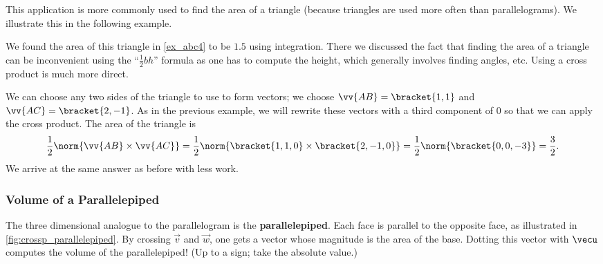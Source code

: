 This application is more commonly used to find the area of a triangle (because triangles are used more often than parallelograms). We illustrate this in the following example.

{We found the area of this triangle in \autoref{ex_abc4} to be $1.5$ using integration. There we discussed the fact that finding the area of a triangle can be inconvenient using the ``$\frac12bh$'' formula as one has to compute the height, which generally involves finding angles, etc. Using a cross product is much more direct.


We can choose any two sides of the triangle to use to form vectors; we choose $\vv{AB} = \bracket{1,1}$ and $\vv{AC}=\bracket{2,-1}$. As in the previous example, we will rewrite these vectors with a third component of 0 so that we can apply the cross product. The area of the triangle is
\[
\frac12\norm{\vv{AB}\times\vv{AC}}
= \frac12\norm{\bracket{1,1,0}\times \bracket{2,-1,0}}
= \frac12\norm{\bracket{0,0,-3}} = \frac32.
\]
We arrive at the same answer as before with less work.}

\subsubsection{Volume of a Parallelepiped}

The three dimensional analogue to the parallelogram is the \textbf{parallelepiped}.
Each face is parallel to the opposite face, as illustrated in \autoref{fig:crossp_parallelepiped}. By crossing $\vec v$ and $\vec w$, one gets a vector whose magnitude is the area of the base. Dotting this vector with $\vecu$ computes the volume of the parallelepiped! (Up to a sign; take the absolute value.)

